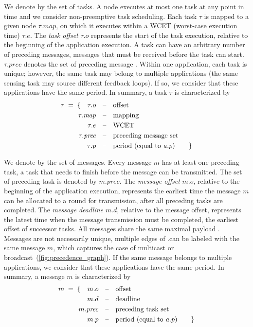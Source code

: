 We denote by \taskset the set of tasks.
A node executes at most one task at any point in time and we consider non-preemptive task scheduling.
Each task $\tau$ is mapped to a given node $\tau.map$, on which it executes within a WCET (worst-case execution time) $\tau.e$.
The \emph{task offset} $\tau.o$ represents the start of the task execution, relative to the beginning of the application execution.
A task can have an arbitrary number of preceding messages, \ie messages that must be received before the task can start. $\tau.prec$ denotes the set of preceding message \ids.
Within one application, each task is unique; however, the same task may belong to multiple applications (\eg the same sensing task may source different feedback loops). If so, we consider that these applications have the same period.
In summary, a task $\tau$ is characterized by
\begin{align*}
\tau \; = \; \{ \quad
	 \tau.o
	\quad &\text{--\quad offset} \\
	 \tau.\mathit{map}
	\quad &\text{--\quad mapping} \\
	 \tau.e
	\quad &\text{--\quad WCET} \\
	 \tau.\mathit{prec}
	\quad &\text{--\quad preceding message set} \\
	 \tau.p
	\quad &\text{--\quad period (equal to $\mathit{a_{}}.p$)} \quad \quad \}
\end{align*}

We denote by \messageset the set of messages.
Every message $m$ has at least one preceding task, \ie a task that needs to finish before the message can be transmitted. The set of preceding task \ids is denoted by $m.prec$.
The \emph{message offset} $m.o$, relative to the beginning of the application execution, represents the earliest time the message $m$ can be allocated to a round for transmission, \ie after all preceding tasks are completed.
The \emph{message deadline} $m.d$, relative to the message offset, represents the latest time when the message transmission must be completed, \ie the earliest offset of successor tasks.
All messages share the same maximal payload \Lmax.
Messages are not necessarily unique, \ie multiple edges of \app.\predG can be labeled with the same message $m$, which captures the case of multicast or broadcast~(\cref{fig:precedence_graph}).
If the same message belongs to multiple applications, we consider that these applications have the same period.
In summary, a message $m$ is characterized by
\begin{align*}
m \; = \; \{ \quad
	 m.o
	\quad &\text{--\quad offset} \\
	 m.d
	\quad &\text{--\quad deadline} \\
	 m.\mathit{prec}
	\quad &\text{--\quad preceding task set} \\
	 m.p
	\quad &\text{--\quad period (equal to $\mathit{a_{}}.p$)} \quad \quad \}
\end{align*}


